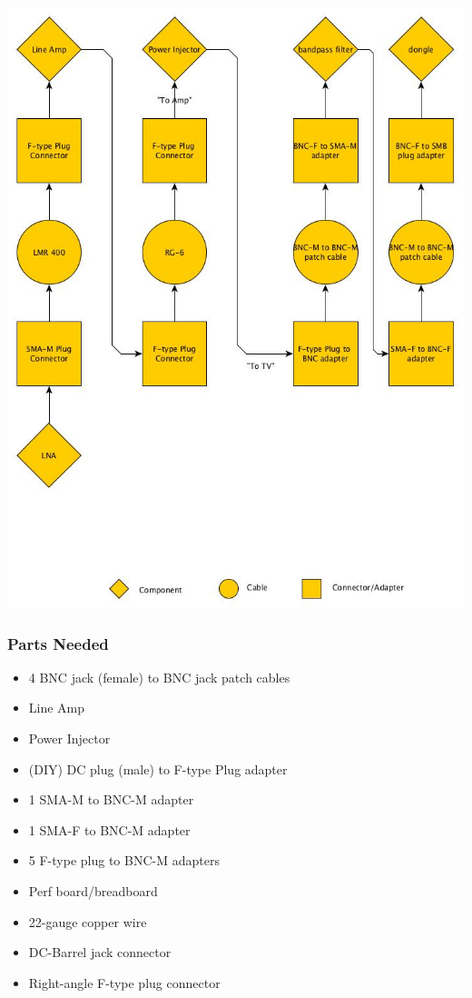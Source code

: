 \documentclass[11pt]{article} %
\begin{document}
\begin{center}
\includegraphics[scale=0.35]{lnainterface/01.jpeg}
\end{center}


\subsubsection{Parts Needed}

\begin{itemize}
\item 4 BNC jack (female) to BNC jack patch cables
\item Line Amp
\item Power Injector
\item (DIY) DC plug (male) to F-type Plug adapter
\item 1 SMA-M to BNC-M adapter
\item 1 SMA-F to BNC-M adapter
\item 5 F-type plug to BNC-M adapters
\item Perf board/breadboard
\item 22-gauge copper wire
\item DC-Barrel jack connector
\item Right-angle F-type plug connector
\end{itemize}
\end{document}

